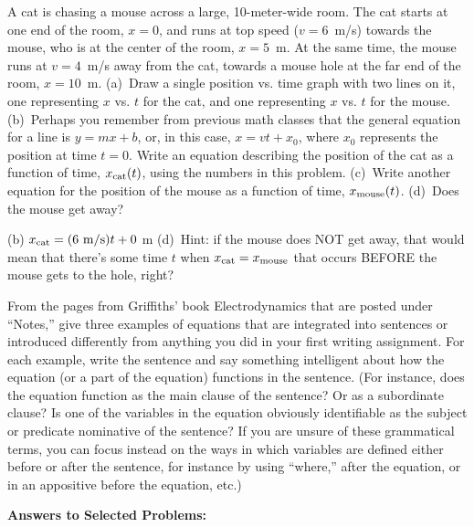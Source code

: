 \begin{Exercise}
A cat is chasing a mouse across a large, 10-meter-wide room.  The cat starts at one end of the room, $x=0$, and runs at top speed ($v=6$~m/s) towards the mouse, who is at the center of the room, $x=5$~m.  At the same time, the mouse runs at $v=4$~m/s away from the cat, towards a mouse hole at the far end of the room, $x=10$~m.  (a)~Draw a single position vs. time graph with two lines on it, one representing $x$ vs. $t$ for the cat, and one representing $x$ vs. $t$ for the mouse.  (b)~Perhaps you remember from previous math classes that the general equation for a line is $y=mx+b$, or, in this case, $x=vt+x_0$, where $x_0$ represents the position at time $t=0$. Write an equation describing the position of the cat as a function of time, $x_{\rm cat}(t)$, using the numbers in this problem.  (c)~Write another equation for the position of the mouse as a function of time, $x_{\rm mouse}(t)$.  (d)~Does the mouse get away?
\end{Exercise}
\begin{Answer}
(b) $x_{\rm cat} =(6~{\rm m/s})t+0$ m  (d)~Hint: if the mouse does NOT get away, that would mean that there's some time $t$ when $x_{\rm cat} =x_{\rm mouse}$  that occurs BEFORE the mouse gets to the hole, right? 
\end{Answer}

\begin{Exercise}
From the pages from Griffiths' book Electrodynamics that are posted under ``Notes,'' give three examples of equations that are integrated into sentences or introduced differently from anything you did in your first writing assignment. For each example, write the sentence and say something intelligent about how the equation (or a part of the equation) functions in the sentence.  (For instance, does the equation function as the main clause of the sentence?  Or as a subordinate clause?  Is one of the variables in the equation obviously identifiable as the subject or predicate nominative of the sentence? If you are unsure of these grammatical terms, you can focus instead on the ways in which variables are defined either before or after the sentence, for instance by using ``where,'' after the equation, or in an appositive before the equation, etc.) 
\end{Exercise}



\bigskip\bigskip\bigskip
\pagebreak[3]
\textbf{Answers to Selected {\thesubsection} Problems:}
\label{waves_and_velocity_prob_answers}
\shipoutAnswer

\cleardoublepage

